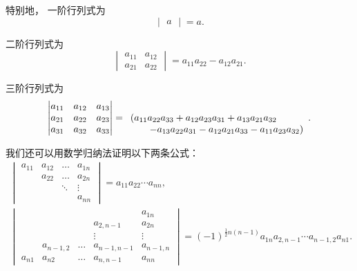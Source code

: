特别地，%
一阶行列式为
\begin{equation}
	\begin{vmatrix} a \end{vmatrix} = a.
\end{equation}

二阶行列式为
\begin{equation}
	\begin{vmatrix}
		a_{11} & a_{12} \\
		a_{21} & a_{22}
	\end{vmatrix}
	= a_{11} a_{22} - a_{12} a_{21}.
\end{equation}

三阶行列式为
\begin{equation}
	\begin{vmatrix}
		a_{11} & a_{12} & a_{13} \\
		a_{21} & a_{22} & a_{23} \\
		a_{31} & a_{32} & a_{33}
	\end{vmatrix}
	= \begin{array}[t]{l}
		(a_{11} a_{22} a_{33} + a_{12} a_{23} a_{31} + a_{13} a_{21} a_{32} \\
		\hspace{20pt}
		- a_{13} a_{22} a_{31} - a_{12} a_{21} a_{33} - a_{11} a_{23} a_{32})
	\end{array}.
\end{equation}

我们还可以用数学归纳法证明以下两条公式：
\begin{gather}
	\begin{vmatrix}
		a_{11} & a_{12} & \dots & a_{1n} \\
		& a_{22} & \dots & a_{2n} \\
		& & \ddots & \vdots \\
		& & & a_{nn}
	\end{vmatrix}
	= a_{11} a_{22} \dotsm a_{nn}, \\%
	\begin{vmatrix}
		& & & & a_{1n} \\
		& & & a_{2,n-1} & a_{2n} \\
		& & & \vdots & \vdots \\
		& a_{n-1,2} & \dots & a_{n-1,n-1} & a_{n-1,n} \\
		a_{n1} & a_{n2} & \dots & a_{n,n-1} & a_{nn}
	\end{vmatrix}
	=(-1)^{\frac{1}{2}n(n-1)} a_{1n} a_{2,n-1} \dotsm a_{n-1,2} a_{n1}.
\end{gather}

